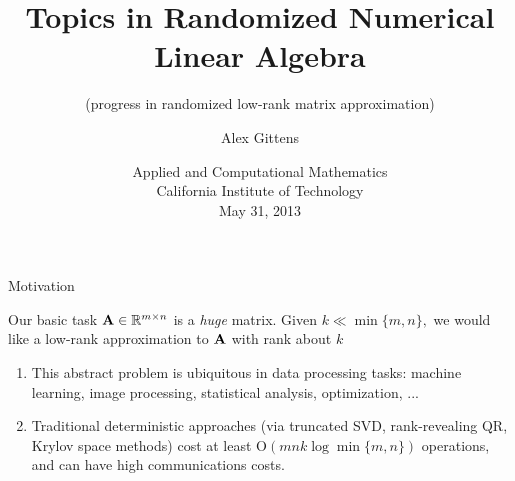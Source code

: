 \documentclass[xcolor=x11names,compress,ignorenonframetext]{beamer}
\renewcommand{\(}{\begin{columns}}
\renewcommand{\)}{\end{columns}}
\newcommand{\<}[1]{\begin{column}{#1}}
\renewcommand{\>}{\end{column}}
\begin{document}
\begin{frame}
\title{Topics in Randomized Numerical Linear Algebra}
\subtitle{(progress in randomized low-rank matrix approximation)}
\author{
	Alex Gittens
}
\date{
	Applied and Computational Mathematics \\
	California Institute of Technology \\
	May 31, 2013
}
\titlepage
\end{frame}


\begin{frame}{Motivation}
 \begin{block}{Our basic task}
  $\mathbf{A} \in \mathbb{R}^{m \times n}$ is a \emph{huge} matrix. Given $k \ll \min\{m,n\},$ we
  would like a low-rank approximation to $\mathbf{A}$ with rank about $k$
 \end{block}

 \begin{enumerate}
  \item This abstract problem is ubiquitous in data processing tasks: machine learning,
  image processing, statistical analysis, optimization, ...
  \item Traditional deterministic approaches (via truncated SVD, rank-revealing QR, Krylov space methods)
  cost at least $\mathrm{O}(mnk\log \min\{m, n\})$ operations, and can have high communications costs.
 \end{enumerate}

\end{frame}
\end{document}

